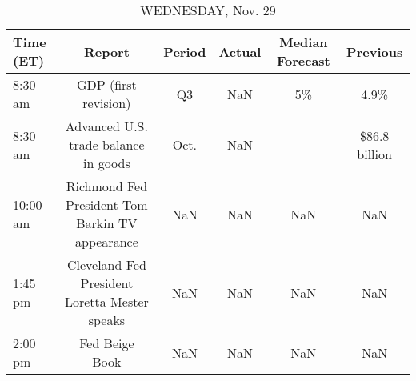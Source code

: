 \documentclass{article}%
\begin{document}
\begin{table}[htbp]%
\caption{WEDNESDAY, Nov. 29}%
\centering%
\begin{adjustbox}{width=1\textwidth}%
\begin{tabular}{lccccc}
\toprule
Time (ET) &                                          Report & Period & Actual & Median Forecast &      Previous \\
\midrule
  8:30 am &                            GDP (first revision) &     Q3 &    NaN &              5\% &          4.9\% \\
  8:30 am &            Advanced U.S. trade balance in goods &   Oct. &    NaN &              -- & \$86.8 billion \\
 10:00 am & Richmond Fed President Tom Barkin TV appearance &    NaN &    NaN &             NaN &           NaN \\
  1:45 pm &   Cleveland Fed President Loretta Mester speaks &    NaN &    NaN &             NaN &           NaN \\
  2:00 pm &                                  Fed Beige Book &    NaN &    NaN &             NaN &           NaN \\
\bottomrule
\end{tabular}
%
\end{adjustbox}%
\end{table}

%
\end{document}

